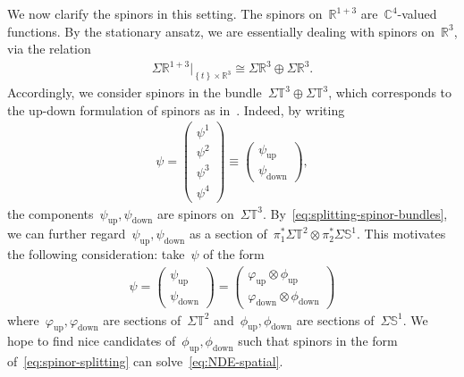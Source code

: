 \documentclass[11pt,final]{amsart}
\newcommand{\R}{\mathbb{R}}
\newcommand{\C}{\mathbb{C}}
\newcommand{\T}{\mathbb{T}}
\newcommand{\sph}{\mathbb{S}}
\newcommand{\braces}[1]{\left\{#1\right\}} %
\DeclareMathOperator{\up}{up}
\DeclareMathOperator{\down}{down}
\begin{document}
We now clarify the spinors in this setting. 
The spinors on~$\R^{1+3}$ are~$\C^4$-valued functions. 
By the stationary ansatz, we are essentially dealing with spinors on~$\R^3$, via the relation 
\begin{align}
    \Sigma\R^{1+3}|_{\braces{t}\times \R^3}\cong \Sigma\R^3 \oplus \Sigma \R^3. 
\end{align}
Accordingly, we consider spinors in the bundle~$\Sigma\T^3\oplus\Sigma\T^3$, which corresponds to the up-down formulation of spinors as in~\cite{WZ2026Stationary}. 
Indeed, by writing
\begin{align}\label{eq:up-down}
    \psi= \begin{pmatrix}\psi^1\\ \psi^2 \\ \psi^3 \\ \psi^4\end{pmatrix}
    \equiv \begin{pmatrix} \psi_{\up} \\ \psi_{\down} \end{pmatrix}, 
\end{align}
the components~$\psi_{\up},\psi_{\down}$ are spinors on~$\Sigma \T^3$.
By~\eqref{eq:splitting-spinor-bundles}, we can further regard~$\psi_{\up},\psi_{\down}$ as a section of~$\pi_1^*\Sigma\T^2\otimes\pi_2^*\Sigma\sph^1$.
This motivates the following consideration: take~$\psi$ of the form
\begin{align}\label{eq:spinor-splitting}
    \psi= \begin{pmatrix}
        \psi_{\up} \\ \psi_{\down}
    \end{pmatrix}
    = 
    \begin{pmatrix}
        \varphi_{\up}\otimes \phi_{\up} \\ 
        \varphi_{\down}\otimes \phi_{\down}
    \end{pmatrix}
\end{align}
where~$\varphi_{\up},\varphi_{\down}$ are sections of~$\Sigma\T^2$ and~$\phi_{\up},\phi_{\down}$ are sections of~$\Sigma\sph^1$.
We hope to find nice candidates of~$\phi_{\up},\phi_{\down}$ such that spinors in the form of~\eqref{eq:spinor-splitting} can solve~\eqref{eq:NDE-spatial}.

\ 
\end{document}
